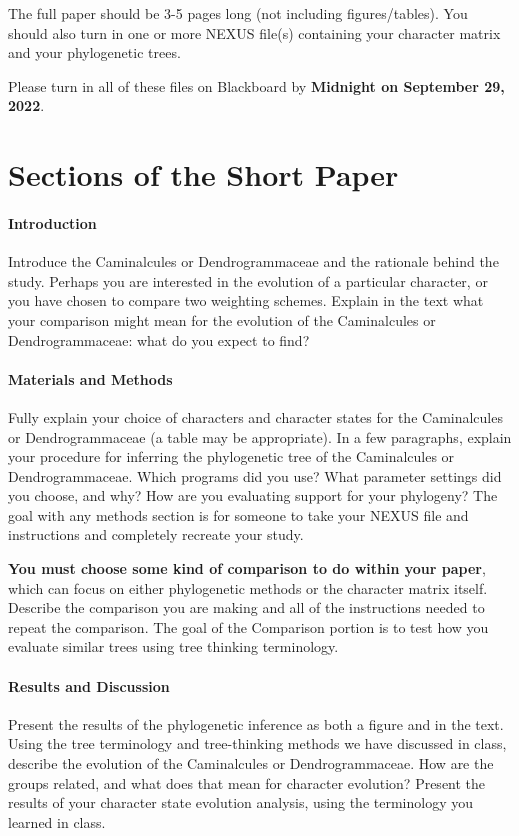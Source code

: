 \documentclass[12pt]{article}
\begin{document}
The full paper should be 3-5 pages long (not including figures/tables).
You should also turn in one or more NEXUS file(s) containing your character matrix and your phylogenetic trees.

Please turn in all of these files on Blackboard by \textbf{Midnight on September 29, 2022}.

\section{Sections of the Short Paper}

\paragraph{Introduction}
Introduce the Caminalcules or Dendrogrammaceae and the rationale behind the study. 
Perhaps you are interested in the evolution of a particular character, or you have chosen to compare two weighting schemes.
Explain in the text what your comparison might mean for the evolution of the Caminalcules or Dendrogrammaceae: what do you expect to find?

\paragraph{Materials and Methods}
Fully explain your choice of characters and character states for the Caminalcules or Dendrogrammaceae (a table may be appropriate).
In a few paragraphs, explain your procedure for inferring the phylogenetic tree of the Caminalcules or Dendrogrammaceae.
Which programs did you use? 
What parameter settings did you choose, and why?
How are you evaluating support for your phylogeny?
The goal with any methods section is for someone to take your NEXUS file and instructions and completely recreate your study.

\textbf{You must choose some kind of comparison to do within your paper}, which can focus on either phylogenetic methods or the character matrix itself.
Describe the comparison you are making and all of the instructions needed to repeat the comparison.
The goal of the Comparison portion is to test how you evaluate similar trees using tree thinking terminology.


\paragraph{Results and Discussion}
Present the results of the phylogenetic inference as both a figure and in the text.
Using the tree terminology and tree-thinking methods we have discussed in class, describe the evolution of the Caminalcules or Dendrogrammaceae.
How are the groups related, and what does that mean for character evolution?
Present the results of your character state evolution analysis, using the terminology you learned in class.
\end{document}
